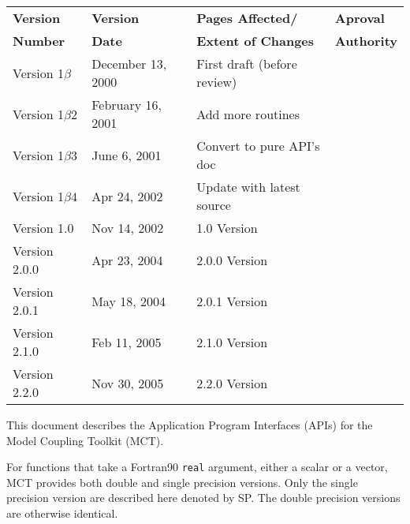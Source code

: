 \documentclass{article}
\begin{document}
\begin{center}
\begin{tabular}{|l|l|l|l|}\hline
{\bf Version} & {\bf Version} & {\bf Pages Affected/}   & {\bf Aproval}\\
{\bf Number}  & {\bf Date}    & {\bf Extent of Changes} & {\bf Authority}\\
\hline
\hline 
Version 1$\beta$ & December 13, 2000      & First draft (before review) &
\\\hline
Version 1$\beta2$ & February 16, 2001      & Add more routines &
\\\hline
Version 1$\beta3$ & June 6, 2001      & Convert to pure API's doc &
\\\hline
Version 1$\beta4$ & Apr 24, 2002      & Update with latest source &
\\\hline
Version 1.0 & Nov 14, 2002      & 1.0 Version &
\\\hline
Version 2.0.0 & Apr 23, 2004      & 2.0.0 Version &
\\\hline
Version 2.0.1 & May 18, 2004      & 2.0.1 Version &
\\\hline
Version 2.1.0 & Feb 11, 2005      & 2.1.0 Version &
\\\hline
Version 2.2.0 & Nov 30, 2005      & 2.2.0 Version &
\\\hline
\end{tabular}
\end{center}

\vspace*{\fill}


\newpage
\setcounter{page}{3}     %

\vspace*{\fill}

This document describes the Application Program Interfaces (APIs)
for the Model Coupling Toolkit (MCT).

For functions that take a Fortran90 {\tt real} argument, either a scalar or
a vector, MCT provides both double and single precision versions.  Only
the single precision version are described here denoted by SP.  The double precision versions
are otherwise identical.

\vspace*{\fill}
\newpage

\tableofcontents
\newpage

\end{document}
